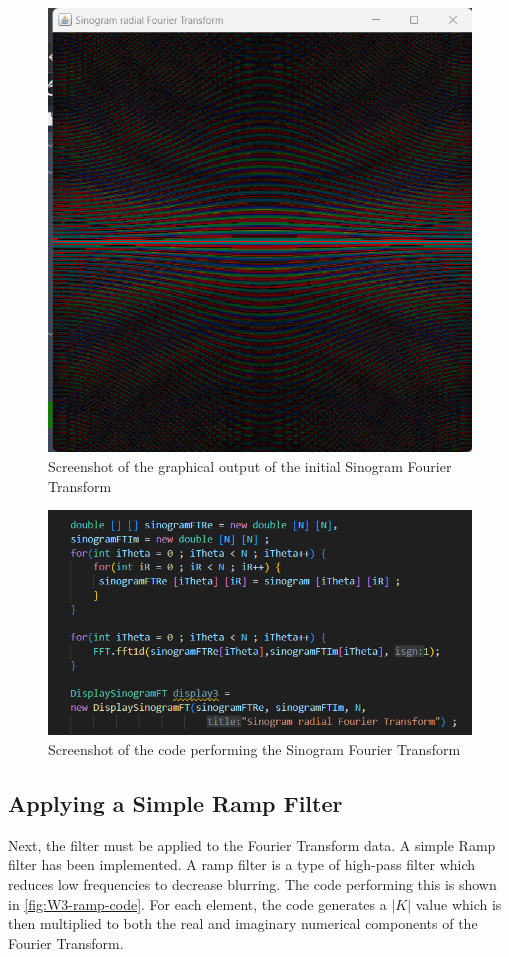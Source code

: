 \begin{figure}[H] 
    \centering
    \includegraphics[width=0.9\columnwidth]{Figures/Week 3/initial-FFTpng.png}
    \caption{Screenshot of the graphical output of the initial Sinogram Fourier Transform}
    \label{fig:W3-initial-FT}
\end{figure}
\begin{figure}[H] 
    \centering
    \includegraphics[width=0.49\columnwidth]{Figures/Week 3/initial-FFT-code.png}
    \caption{Screenshot of the code performing the Sinogram Fourier Transform}
    \label{fig:W3-initial-FT-code}
\end{figure}




\subsection{Applying a Simple Ramp Filter}
Next, the filter must be applied to the Fourier Transform data. A simple Ramp filter has been implemented. A ramp filter is a type of high-pass filter which reduces low frequencies to decrease blurring. The code performing this is shown in \autoref{fig:W3-ramp-code}. For each element, the code generates a $|K|$ value which is then multiplied to both the real and imaginary numerical components of the Fourier Transform.

